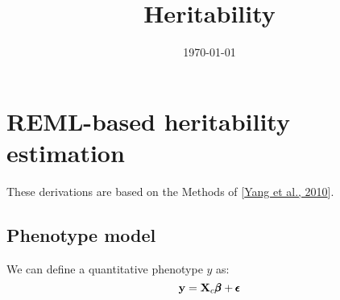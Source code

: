 \documentclass[12pt]{article}
\title{Heritability}
\date{\today}
\begin{document}
\maketitle

\section{REML-based heritability estimation}
These derivations are based on the Methods of [\href{https://www.nature.com/articles/ng.608}{Yang et al., 2010}]. 

\subsection{Phenotype model}
We can define a quantitative phenotype $y$ as:
$$ \mathbf{y} = \mathbf{X}_c \pmb{\beta} + \pmb{\epsilon} $$
\end{document}
